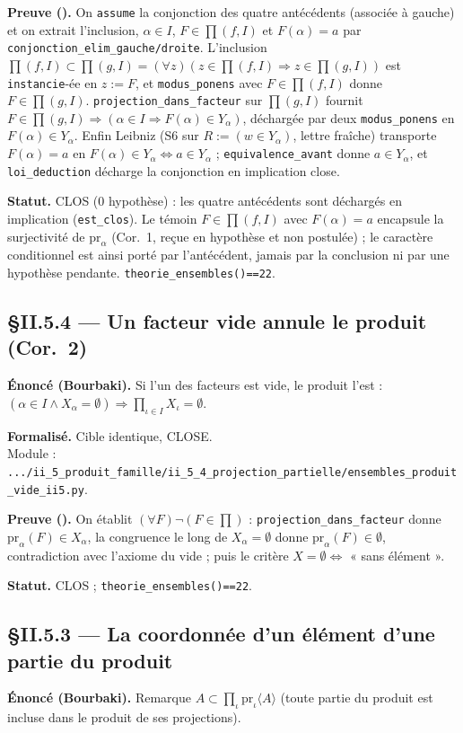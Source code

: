 \textbf{Preuve (\Nstar).} On \texttt{assume} la conjonction des quatre antécédents (associée à gauche) et on extrait l'inclusion, $\alpha\in I$, $F\in\prod(f,I)$ et $F(\alpha)=a$ par \texttt{conjonction\_elim\_gauche/droite}. L'inclusion $\prod(f,I)\subset\prod(g,I)=(\forall z)(z\in\prod(f,I)\Rightarrow z\in\prod(g,I))$ est \texttt{instancie}-ée en $z:=F$, et \texttt{modus\_ponens} avec $F\in\prod(f,I)$ donne $F\in\prod(g,I)$. \texttt{projection\_dans\_facteur} sur $\prod(g,I)$ fournit $F\in\prod(g,I)\Rightarrow(\alpha\in I\Rightarrow F(\alpha)\in Y_\alpha)$, déchargée par deux \texttt{modus\_ponens} en $F(\alpha)\in Y_\alpha$. Enfin Leibniz (S6 sur $R:=(w\in Y_\alpha)$, lettre fraîche) transporte $F(\alpha)=a$ en $F(\alpha)\in Y_\alpha\Leftrightarrow a\in Y_\alpha$ ; \texttt{equivalence\_avant} donne $a\in Y_\alpha$, et \texttt{loi\_deduction} décharge la conjonction en implication close.

\textbf{Statut.} CLOS (0 hypothèse) : les quatre antécédents sont déchargés en implication (\texttt{est\_clos}). Le témoin $F\in\prod(f,I)$ avec $F(\alpha)=a$ encapsule la surjectivité de $\mathrm{pr}_\alpha$ (Cor.~1, reçue en hypothèse et non postulée) ; le caractère conditionnel est ainsi porté par l'antécédent, jamais par la conclusion ni par une hypothèse pendante. \texttt{theorie\_ensembles()==22}.


\subsection{§II.5.4 --- Un facteur vide annule le produit (Cor.\ 2)}
\textbf{Énoncé (Bourbaki).} Si l'un des facteurs est vide, le produit l'est :
$(\alpha\in I \wedge X_\alpha=\emptyset) \Rightarrow \prod_{\iota\in I}X_\iota=\emptyset$.

\textbf{Formalisé.} Cible identique, CLOSE. \\
Module : \texttt{.../ii\_5\_produit\_famille/ii\_5\_4\_projection\_partielle/ensembles\_produit\_vide\_ii5.py}.

\textbf{Preuve (\Nstar).} On établit $(\forall F)\neg(F\in\prod)$ :
\texttt{projection\_dans\_facteur} donne $\mathrm{pr}_\alpha(F)\in X_\alpha$,
la congruence le long de $X_\alpha=\emptyset$ donne $\mathrm{pr}_\alpha(F)\in\emptyset$,
contradiction avec l'axiome du vide ; puis le critère $X=\emptyset \Leftrightarrow$ « sans élément ».

\textbf{Statut.} CLOS ; \texttt{theorie\_ensembles()==22}.

\subsection{§II.5.3 --- La coordonnée d'un élément d'une partie du produit}
\textbf{Énoncé (Bourbaki).} Remarque $A\subset\prod_\iota \mathrm{pr}_\iota\langle A\rangle$
(toute partie du produit est incluse dans le produit de ses projections).

